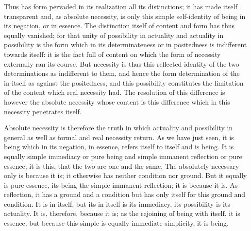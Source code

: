 Thus has form pervaded in its realization all its distinctions;
it has made itself transparent
and, as absolute necessity,
is only this simple self-identity of
being in its negation, or in essence.
The distinction itself of content and form
has thus equally vanished;
for that unity of possibility in actuality
and actuality in possibility is the form
which in its determinateness or in positedness is
indifferent towards itself:
it is the fact full of content
on which the form of necessity
externally ran its course.
But necessity is thus this
reflected identity of the two determinations
as indifferent to them,
and hence the form determination of the in-itself
as against the positedness,
and this possibility constitutes the limitation of
the content which real necessity had.
The resolution of this difference is
however the absolute necessity
whose content is this difference
which in this necessity penetrates itself.

Absolute necessity is therefore the truth
in which actuality and possibility in general
as well as formal and real necessity return.
As we have just seen, it is being which in its negation,
in essence, refers itself to itself and is being.
It is equally simple immediacy or pure being
and simple immanent reflection or pure essence;
it is this, that the two are one and the same.
The absolutely necessary only is because it is;
it otherwise has neither condition nor ground.
But it equally is pure essence,
its being the simple immanent reflection;
it is because it is.
As reflection, it has a ground and a condition
but has only itself for this ground and condition.
It is in-itself, but its in-itself is its immediacy,
its possibility is its actuality.
It is, therefore, because it is;
as the rejoining of being with itself,
it is essence;
but because this simple is
equally immediate simplicity,
it is being.

